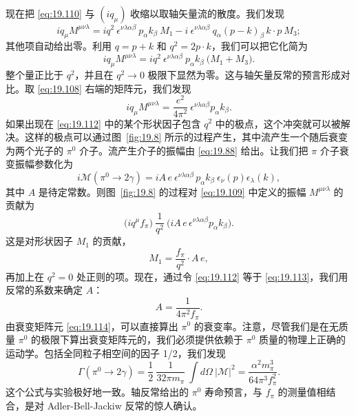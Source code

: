 现在把 \eqref{eq:19.110} 与 $(iq_\mu)$ 收缩以取轴矢量流的散度。我们发现
\begin{equation}
  iq_\mu M^{\mu\nu\lambda} = iq^2\ \epsilon^{\nu\lambda\alpha\beta}\ p_\alpha
    k_\beta\ M_1 - i\ \epsilon^{\nu\lambda\alpha\beta}\ q_\alpha(p-k)_\beta\,
    k\cdot p\ M_3 ;
  \label{eq:19.111}
\end{equation}
其他项自动给出零。利用 $q = p + k$ 和 $q^2 = 2p\cdot k$，我们可以把它化简为
\begin{equation}
  iq_\mu M^{\mu\nu\lambda} = iq^2\ \epsilon^{\nu\lambda\alpha\beta}\ p_\alpha
    k_\beta\ \bigl( M_1 + M_3 \bigr) .
  \label{eq:19.112}
\end{equation}
整个量正比于 $q^2$，并且在 $q^2\to 0$ 极限下显然为零。这与轴矢量反常的预言形成对比。取 \eqref{eq:19.108} 右端的矩阵元，我们发现
\begin{equation}
  iq_\mu M^{\mu\nu\lambda} = \frac{e^2}{4\pi^2}\ \epsilon^{\nu\lambda\alpha\beta}
    p_\alpha k_\beta .
  \label{eq:19.113}
\end{equation}
如果出现在 \eqref{eq:19.112} 中的某个形状因子包含 $q^2$ 中的极点，这个冲突就可以被解决。这样的极点可以通过图~\ref{fig:19.8} 所示的过程产生，其中流产生一个随后衰变为两个光子的 $\pi^0$ 介子。流产生介子的振幅由 \eqref{eq:19.88} 给出。让我们把 $\pi$ 介子衰变振幅参数化为
\begin{equation}
  i\mathcal{M}(\pi^0 \to 2\gamma) = iA\,e\ \epsilon^{\nu\lambda\alpha\beta}\,
    p_\alpha k_\beta\ \epsilon_\nu(p)\epsilon_\lambda(k) ,
  \label{eq:19.114}
\end{equation}
其中 $A$ 是待定常数。则图~\ref{fig:19.8} 的过程对 \eqref{eq:19.109} 中定义的振幅 $M^{\mu\nu\lambda}$ 的贡献为
\begin{equation}
  \bigl( iq^\mu f_\pi \bigr)\ \frac{1}{q^2}\ \bigl( iA\,e\,
    \epsilon^{\nu\lambda\alpha\beta}p_\alpha k_\beta \bigr) .
  \label{eq:19.115}
\end{equation}
这是对形状因子 $M_1$ 的贡献，
\begin{equation}
  M_1 = \frac{f_\pi}{q^2}\cdot A\,e ,
  \label{eq:19.116}
\end{equation}
再加上在 $q^2 = 0$ 处正则的项。现在，通过令 \eqref{eq:19.112} 等于 \eqref{eq:19.113}，我们用反常的系数来确定 $A$：
\begin{equation}
  A = \frac{1}{4\pi^2 f_\pi} .
  \label{eq:19.117}
\end{equation}
由衰变矩阵元 \eqref{eq:19.114}，可以直接算出 $\pi^0$ 的衰变率。注意，尽管我们是在无质量 $\pi^0$ 的极限下算出衰变矩阵元的，我们必须提供依赖于 $\pi^0$ 质量的物理上正确的运动学。包括全同粒子相空间的因子 1/2，我们发现
\begin{equation}
  \Gamma(\pi^0 \to 2\gamma) = \frac{1}{2}\ \frac{1}{32\pi m_\pi}\ \int
    d\Omega\ |\mathcal{M}|^2 = \frac{\alpha^2 m_\pi^3}{64\pi^3 f_\pi^2} .
  \label{eq:19.118}
\end{equation}
这个公式与实验极好地一致。轴反常给出的 $\pi^0$ 寿命预言，与 $f_\pi$ 的测量值相结合，是对 Adler-Bell-Jackiw 反常的惊人确认。

